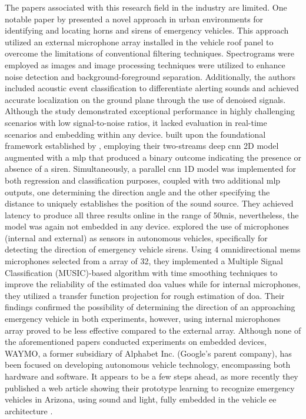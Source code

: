 The papers associated with this research field in the industry are limited. One notable paper by \textcite{Marchegiani2022} presented a novel approach in urban environments for identifying and locating horns and sirens of emergency vehicles. This approach utilized an external microphone array installed in the vehicle roof panel to overcome the limitations of conventional filtering techniques. Spectrograms were employed as images and image processing techniques were utilized to enhance noise detection and background-foreground separation. Additionally, the authors included acoustic event classification to differentiate alerting sounds and achieved accurate localization on the ground plane through the use of denoised signals. Although the study demonstrated exceptional performance in highly challenging scenarios with low signal-to-noise ratios, it lacked evaluation in real-time scenarios and embedding within any device. \textcite{Sun2021} built upon the foundational framework established by \textcite{Tran2020}, employing their two-streams deep \gls{cnn} 2D model augmented with a \gls{mlp} that produced a binary outcome indicating the presence or absence of a siren. Simultaneously, a parallel \gls{cnn} 1D model was implemented for both regression and classification purposes, coupled with two additional \gls{mlp} outputs, one determining the direction angle and the other specifying the distance to uniquely establishes the position of the sound source. They achieved latency to produce all three results online in the range of 50\gls{mi}\gls{s}, nevertheless, the model was again not embedded in any device. \textcite{Shabtai2019} explored the use of microphones (internal and external) as sensors in autonomous vehicles, specifically for detecting the direction of emergency vehicle sirens. Using 4 omnidirectional \gls{mems} microphones selected from a array of 32, they implemented a Multiple Signal Classification (MUSIC)-based algorithm with time smoothing techniques to improve the reliability of the estimated \gls{doa} values while for internal microphones, they utilized a transfer function projection for rough estimation of \gls{doa}. Their findings confirmed the possibility of determining the direction of an approaching emergency vehicle in both experiments, however, using internal microphones array proved to be less effective compared to the external array. Although none of the aforementioned papers conducted experiments on embedded devices, WAYMO, a former subsidiary of Alphabet Inc. (Google's parent company), has been focused on developing autonomous vehicle technology, encompassing both hardware and software. It appears to be a few steps ahead, as more recently they published a web article showing their prototype learning to recognize emergency vehicles in Arizona, using sound and light, fully embedded in the vehicle \gls{ee} architecture \cite{WAYMO2023}. 

